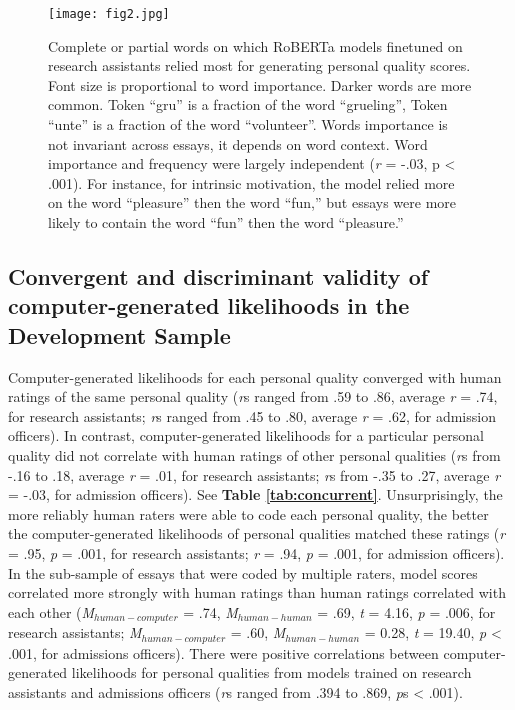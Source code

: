 \documentclass[11pt]{report}
\begin{document}
\begin{mainf}
\begin{figure}[ht]
    \centering
    \texttt{[image: fig2.jpg]}
    \caption{Complete or partial words on which RoBERTa models finetuned on research assistants relied most for generating personal quality scores. Font size is proportional to word importance.  Darker words are more common. Token ``gru'' is a fraction of the word ``grueling'', Token ``unte'' is a fraction of the word ``volunteer''. 
    Words importance is not invariant across essays, it depends on word context.
    Word importance and frequency were largely independent (\textit{r} = -.03, p < .001). For instance, for intrinsic motivation, the model relied more on the word ``pleasure'' then the word ``fun,'' but essays were more likely to contain the word ``fun'' then the word ``pleasure.''}
    \label{fig:interpret}
\end{figure}


\subsection{Convergent and discriminant validity of computer-generated likelihoods in the Development Sample}
Computer-generated likelihoods for each personal quality converged with human ratings of the same personal quality (\textit{r}s ranged from .59 to .86, average \textit{r} = .74, for research assistants; \textit{r}s ranged from .45 to .80, average \textit{r} = .62, for admission officers). In contrast, computer-generated likelihoods for a particular personal quality did not correlate with human ratings of other personal qualities (\textit{r}s from -.16 to .18, average \textit{r} = .01, for research assistants; \textit{r}s from -.35 to .27, average \textit{r} = -.03, for admission officers). See \textbf{Table \ref{tab:concurrent}}. Unsurprisingly, the more reliably human raters were able to code each personal quality, the better the computer-generated likelihoods of personal qualities matched these ratings (\textit{r} = .95, \textit{p} = .001, for research assistants; \textit{r} = .94, \textit{p} = .001, for admission officers). In the sub-sample of essays that were coded by multiple raters, model scores correlated more strongly with human ratings than human ratings correlated with each other (\textit{M}$_{human-computer}$ = .74, \textit{M}$_{human-human}$ = .69, \textit{t} = 4.16, \textit{p} = .006, for research assistants; \textit{M}$_{human-computer}$ = .60, \textit{M}$_{human-human}$ = 0.28, \textit{t} = 19.40, \textit{p} < .001, for admissions officers). There were positive correlations between computer-generated likelihoods for personal qualities from models trained on research assistants and admissions officers (\textit{r}s ranged from .394 to .869, \textit{p}s < .001).


\end{mainf}
\end{document}
